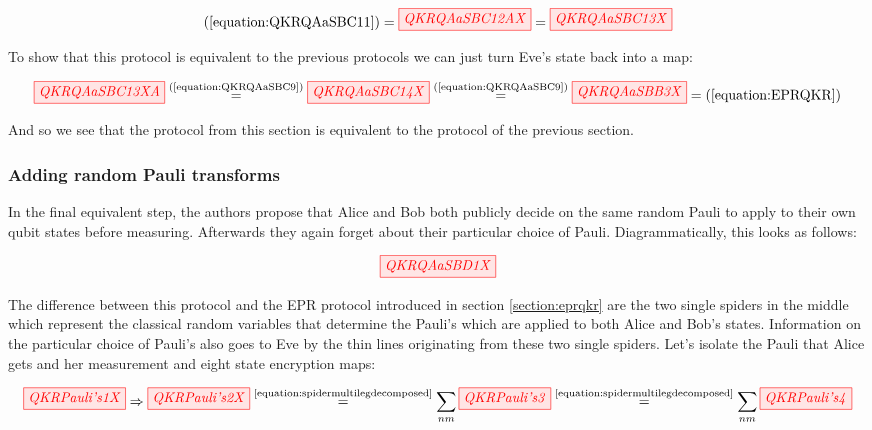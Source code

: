\documentclass[]{article}
\newcommand{\equaltext}[1]{\ensuremath{\stackrel{\text{#1}}{=}}}
\begin{document}
\begin{equation}
	\label{equation:QKRQAaSBC13}
	(\ref{equation:QKRQAaSBC11}) = \tikzfig{QKRQAaSBC12AX} = \tikzfig{QKRQAaSBC13X}
\end{equation}

To show that this protocol is equivalent to the previous protocols we can just turn Eve's state back into a map:

\begin{equation}
\label{equation:QKRQAaSBBFinalResult}
	\tikzfig{QKRQAaSBC13XA} \equaltext{(\ref{equation:QKRQAaSBC9})} \tikzfig{QKRQAaSBC14X} \equaltext{(\ref{equation:QKRQAaSBC9})} \tikzfig{QKRQAaSBB3X} = (\ref{equation:EPRQKR})
\end{equation}

And so we see that the protocol from this section is equivalent to the protocol of the previous section.

\subsubsection{Adding random Pauli transforms}

In the final equivalent step, the authors propose that Alice and Bob both publicly decide on the same random Pauli to apply to their own qubit states before measuring. Afterwards they again forget about their particular choice of Pauli. Diagrammatically, this looks as follows: 

\begin{equation}
\label{equation:QKRQAaSBD1}
\tikzfig{QKRQAaSBD1X}
\end{equation}

The difference between this protocol and the EPR protocol introduced in section \ref{section:eprqkr} are the two single spiders in the middle which represent the classical random variables that determine the Pauli's which are applied to both Alice and Bob's states. Information on the particular choice of Pauli's also goes to Eve by the thin lines originating from these two single spiders. Let's isolate the Pauli that Alice gets and her measurement and eight state encryption maps:

\begin{equation}
	\label{equation:QKRPauli's}
	\tikzfig{QKRPauli's1X} \Rightarrow \tikzfig{QKRPauli's2X} \equaltext{\ref{equation:spidermultilegdecomposed}} \sum\limits_{nm} \tikzfig{QKRPauli's3}  \equaltext{\ref{equation:spidermultilegdecomposed}} \sum\limits_{nm} \tikzfig{QKRPauli's4}
\end{equation}
\end{document}
